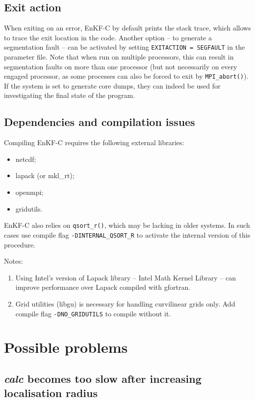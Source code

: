 \documentclass[11pt]{report}
\begin{document}
\subsection{Exit action}

When exiting on an error, EnKF-C by default prints the stack trace, which allows to trace the exit location in the code.
Another option -- to generate a segmentation fault -- can be activated by setting \verb|EXITACTION = SEGFAULT| in the parameter file.
Note that when run on multiple processors, this can result in segmentation faults on more than one processor (but not necessarily on every engaged processor, as some processes can also be forced to exit by \verb|MPI_abort()|).
If the system is set to generate core dumps, they can indeed be used for investigating the final state of the program.

\subsection{Dependencies and compilation issues}

Compiling EnKF-C requires the following external libraries:
\begin{itemize}
\item netcdf;
\item lapack (or mkl\_rt);
\item openmpi;
\item gridutils.
\end{itemize}

EnKF-C also relies on \verb|qsort_r()|, which may be lacking in older systems.
In such cases use compile flag \verb|-DINTERNAL_QSORT_R| to activate the internal version of this procedure.

Notes:
\vspace{-3mm}
\begin{enumerate}
\item Using Intel's version of Lapack library -- Intel Math Kernel Library -- can improve performance over Lapack compiled with gfortran.
\item Grid  utilities (libgu) is necessary for handling curvilinear grids only.
Add compile flag \verb|-DNO_GRIDUTILS| to compile without it.
\end{enumerate}

\section{Possible problems}

\subsection{\emph{calc} becomes too slow after increasing localisation radius}
\end{document}
